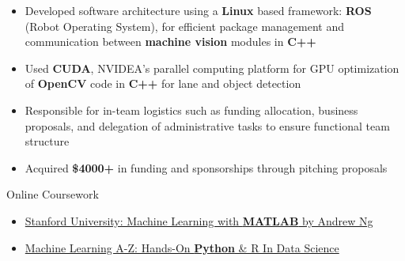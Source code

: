 \smallskip
{}


\divider


\medskip


\begin{itemize}
\item Developed software architecture using a \textbf{Linux} based framework: \textbf{ROS} (Robot Operating System), for efficient package management and communication between \textbf{machine vision} modules in \textbf{C++}
\item Used \textbf{CUDA}, NVIDEA's parallel computing platform for GPU optimization of \textbf{OpenCV} code in \textbf{C++} for lane and object detection
\end{itemize}

\divider

\begin{itemize}
\item Responsible for in-team logistics such as funding allocation, business proposals, and delegation of administrative tasks to ensure functional team structure
\item Acquired \textbf{\$4000+} in funding and sponsorships through pitching proposals
\end{itemize}

\medskip


\medskip



\divider

{\large\color{emphasis}Online Coursework\par}
\smallskip
\begin{itemize}
\item \href{https://www.coursera.org/learn/machine-learning}{Stanford University: Machine Learning with \textbf{MATLAB} by Andrew Ng}
\item \href{https://www.udemy.com/machinelearning/learn/v4/overview}{Machine Learning A-Z: Hands-On \textbf{Python} \& R In Data Science}
\end{itemize}


